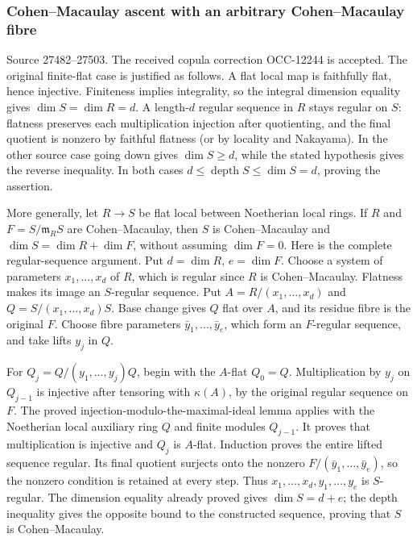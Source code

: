 \subsubsection{Cohen--Macaulay ascent with an arbitrary Cohen--Macaulay fibre}\label{cohenmacaulay-ascent-with-an-arbitrary-cohenmacaulay-fibre}

Source 27482--27503. The received copula correction OCC-12244 is accepted. The original finite-flat case is justified as follows. A flat local map is faithfully flat, hence injective. Finiteness implies integrality, so the integral dimension equality gives \(\dim S=\dim R=d\). A length-\(d\) regular sequence in \(R\) stays regular on \(S\): flatness preserves each multiplication injection after quotienting, and the final quotient is nonzero by faithful flatness (or by locality and Nakayama). In the other source case going down gives \(\dim S\geq d\), while the stated hypothesis gives the reverse inequality. In both cases \(d\leq\operatorname{depth}S\leq\dim S=d\), proving the assertion.

More generally, let \(R\to S\) be flat local between Noetherian local rings. If \(R\) and \(F=S/\mathfrak m_RS\) are Cohen--Macaulay, then \(S\) is Cohen--Macaulay and \(\dim S=\dim R+\dim F\), without assuming \(\dim F=0\). Here is the complete regular-sequence argument. Put \(d=\dim R\), \(e=\dim F\). Choose a system of parameters \(x_1,\ldots,x_d\) of \(R\), which is regular since \(R\) is Cohen--Macaulay. Flatness makes its image an \(S\)-regular sequence. Put \(A=R/(x_1,\ldots,x_d)\) and \(Q=S/(x_1,\ldots,x_d)S\). Base change gives \(Q\) flat over \(A\), and its residue fibre is the original \(F\). Choose fibre parameters \(\bar y_1,\ldots,\bar y_e\), which form an \(F\)-regular sequence, and take lifts \(y_j\) in \(Q\).

For \(Q_j=Q/(y_1,\ldots,y_j)Q\), begin with the \(A\)-flat \(Q_0=Q\). Multiplication by \(y_j\) on \(Q_{j-1}\) is injective after tensoring with \(\kappa(A)\), by the original regular sequence on \(F\). The proved injection-modulo-the-maximal-ideal lemma applies with the Noetherian local auxiliary ring \(Q\) and finite modules \(Q_{j-1}\). It proves that multiplication is injective and \(Q_j\) is \(A\)-flat. Induction proves the entire lifted sequence regular. Its final quotient surjects onto the nonzero \(F/(\bar y_1,\ldots,\bar y_e)\), so the nonzero condition is retained at every step. Thus \(x_1,\ldots,x_d,y_1,\ldots,y_e\) is \(S\)-regular. The dimension equality already proved gives \(\dim S=d+e\); the depth inequality gives the opposite bound to the constructed sequence, proving that \(S\) is Cohen--Macaulay.

